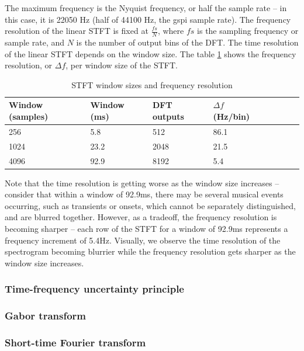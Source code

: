 \documentclass[letter,12pt,notitlepage]{article}
\begin{document}
The maximum frequency is the Nyquist frequency, or half the sample rate -- in this case, it is 22050 Hz (half of 44100 Hz, the gspi sample rate). The frequency resolution of the linear STFT is fixed at $\frac{\mathit{fs}}{N}$, where $\mathit{fs}$ is the sampling frequency or sample rate, and $N$ is the number of output bins of the DFT. The time resolution of the linear STFT depends on the window size. The table \ref{table:stftparams} shows the frequency resolution, or $\Delta f$, per window size of the STFT.

\begin{table}[ht]
	\centering
\begin{tabular}{ |l|l|l|l|c|c|c|c| }
	 \hline
	  Window (samples) & Window (ms) & DFT outputs & $\Delta f$ (Hz/bin) \\
	 \hline
	 \hline
	 256 & 5.8 & 512 & 86.1 \\
	 \hline
	 1024 & 23.2 & 2048 & 21.5  \\
	 \hline
	 4096 & 92.9 & 8192 & 5.4  \\
	 \hline
\end{tabular}
	\caption{STFT window sizes and frequency resolution}
	\label{table:stftparams}
\end{table}

Note that the time resolution is getting worse as the window size increases -- consider that within a window of 92.9ms, there may be several musical events occurring, such as transients or onsets, which cannot be separately distinguished, and are blurred together. However, as a tradeoff, the frequency resolution is becoming sharper -- each row of the STFT for a window of 92.9ms represents a frequency increment of 5.4Hz. Visually, we observe the time resolution of the spectrogram becoming blurrier while the frequency resolution gets sharper as the window size increases.

\subsubsection{Time-frequency uncertainty principle}

\subsubsection{Gabor transform}

\subsubsection{Short-time Fourier transform}
\end{document}
